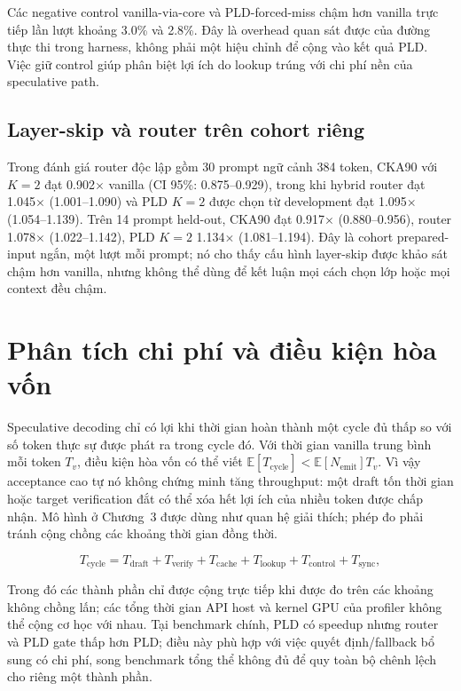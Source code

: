 Các negative control vanilla-via-core và PLD-forced-miss chậm hơn vanilla trực tiếp lần lượt khoảng 3.0\% và 2.8\%. Đây là overhead quan sát được của đường thực thi trong harness, không phải một hiệu chỉnh để cộng vào kết quả PLD. Việc giữ control giúp phân biệt lợi ích do lookup trúng với chi phí nền của speculative path.

\subsection{Layer-skip và router trên cohort riêng}
Trong đánh giá router độc lập gồm 30 prompt ngữ cảnh 384 token, CKA90 với \(K=2\) đạt 0.902\(\times\) vanilla (CI 95\%: 0.875--0.929), trong khi hybrid router đạt 1.045\(\times\) (1.001--1.090) và PLD \(K=2\) được chọn từ development đạt 1.095\(\times\) (1.054--1.139). Trên 14 prompt held-out, CKA90 đạt 0.917\(\times\) (0.880--0.956), router 1.078\(\times\) (1.022--1.142), PLD \(K=2\) 1.134\(\times\) (1.081--1.194). Đây là cohort prepared-input ngắn, một lượt mỗi prompt; nó cho thấy cấu hình layer-skip được khảo sát chậm hơn vanilla, nhưng không thể dùng để kết luận mọi cách chọn lớp hoặc mọi context đều chậm.

\section{Phân tích chi phí và điều kiện hòa vốn}

Speculative decoding chỉ có lợi khi thời gian hoàn thành một cycle đủ thấp so với số token thực sự được phát ra trong cycle đó. Với thời gian vanilla trung bình mỗi token \(T_v\), điều kiện hòa vốn có thể viết \(\mathbb{E}[T_{\mathrm{cycle}}] < \mathbb{E}[N_{\mathrm{emit}}]T_v\). Vì vậy acceptance cao tự nó không chứng minh tăng throughput: một draft tốn thời gian hoặc target verification đắt có thể xóa hết lợi ích của nhiều token được chấp nhận. Mô hình ở Chương~3 được dùng như quan hệ giải thích; phép đo phải tránh cộng chồng các khoảng thời gian đồng thời.

\begin{equation}
T_{\mathrm{cycle}} = T_{\mathrm{draft}} + T_{\mathrm{verify}} + T_{\mathrm{cache}} + T_{\mathrm{lookup}} + T_{\mathrm{control}} + T_{\mathrm{sync}},
\label{eq:ch5-cycle-cost}
\end{equation}

Trong đó các thành phần chỉ được cộng trực tiếp khi được đo trên các khoảng không chồng lấn; các tổng thời gian API host và kernel GPU của profiler không thể cộng cơ học với nhau. Tại benchmark chính, PLD có speedup nhưng router và PLD gate thấp hơn PLD; điều này phù hợp với việc quyết định/fallback bổ sung có chi phí, song benchmark tổng thể không đủ để quy toàn bộ chênh lệch cho riêng một thành phần.

